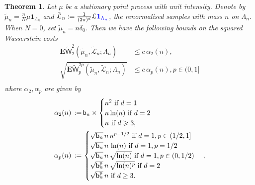 \documentclass[12pt]{article}
\newtheorem{theorem}{Theorem}
\newcommand{\Leb}{\mathcal{L}}
\newcommand{\tLeb}{\tilde{\mathcal{L}}}
\newcommand{\bn}{   \mathsf b_{n}}
\newcommand{\1}{\mathbf{1}}
\newcommand{\tmu}{\tilde{\mu}}
\newcommand{\dy}[1]{\textcolor{blue}{#1}}
\newcommand{\dy}[1]{#1}%
\renewcommand{\footnote}[1]{}
\begin{document}
{{{{\begin{theorem}
\label{thm:Wbd-infinite}
Let $ \mu $ be a stationary point process with unit intensity. Denote by $ \tilde  \mu _{n}= \frac{n}{N} \mu\1_{\Lambda _{n}}$   {and $\tLeb_n := \frac{1}{(2\pi)^d} \Leb \dy{\1_{\Lambda _{n}}}$}, the renormalised samples with mass $n$ on $ \Lambda _{n}.$ {When $N = 0$, set $\tmu_n = n\delta_0$.} Then we have the following bounds on the squared Wasserstein costs
%
\begin{align}
\label{e:W22munLn}
{ \mathbf{E} { \widetilde{ \mathsf W}}_{2}^{2}(\tilde \mu _{n},\tLeb_{n};{\Lambda_n}) \, } &\leqslant c \, \alpha_{2} (n),\\
\sqrt{\mathbf{E}
  { \widetilde {\mathsf W}}_{p}^{{2p}}(\tilde \mu _{n},\tLeb_{n};{\Lambda_n})} &\leqslant c \, \alpha_{p} (n), p\in {(0,1]} \nonumber \\
\end{align}
%
where $\alpha_2, \alpha_p$ are given by
%
\begin{align}
\label{eq:macro-rate-std}\alpha _{2}(n)\, := \, &  { \bn }\times
\begin{cases}
n^{2}$  if $d= 1\\
n\ln(n)$  if $d= 2\\
n$  if $d\geqslant 3,
 \end{cases}\\
\label{eq:macro-rate-std-p}
\alpha_{p} (n) \, := \, &
  \begin{cases}
  {\sqrt{ \bn}}\,  n  \, n^{p-1/2}$ if $d = 1, p \in {(1/2,1]} \\
  {\sqrt{ \bn} \, n \, \ln(n)}$ if $d = 1, p = 1/2 \\
  {\sqrt{\bn} \, n \, \sqrt{\ln(n)}}$ if $d = 1, p \in (0,1/2) \\
  {\sqrt{\bn^p} \, n \, \sqrt{\ln(n)^p}}$  if $d = 2\\
  {\sqrt{\bn^p}} \, n$  if $d \geq 3. \\
   \end{cases},
   \end{align}

\end{theorem}}}}}
\end{document}
